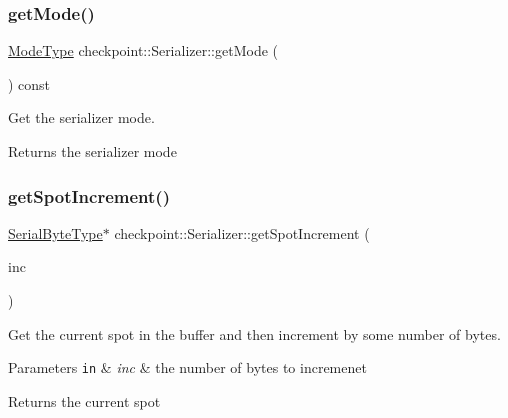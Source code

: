 \subsubsection{\texorpdfstring{get\+Mode()}{getMode()}}
{\footnotesize\ttfamily \hyperlink{namespacecheckpoint_ae2509499ccd8b1dc48fb535bf8aa3059}{Mode\+Type} checkpoint\+::\+Serializer\+::get\+Mode (\begin{DoxyParamCaption}{ }\end{DoxyParamCaption}) const\hspace{0.3cm}{\ttfamily [inline]}}



Get the serializer mode. 

\begin{DoxyReturn}{Returns}
the serializer mode 
\end{DoxyReturn}
\mbox{\label{structcheckpoint_1_1_serializer_af2fc82901c31232b7549b20a8732de30}} 
\subsubsection{\texorpdfstring{get\+Spot\+Increment()}{getSpotIncrement()}}
{\footnotesize\ttfamily \hyperlink{namespacecheckpoint_ae57f01cdc0b81776c23b6c7c934c58f5}{Serial\+Byte\+Type}$\ast$ checkpoint\+::\+Serializer\+::get\+Spot\+Increment (\begin{DoxyParamCaption}\item[{\hyperlink{namespacecheckpoint_a083f6674da3f94c2901b18c6d238217c}{Serial\+Size\+Type} const}]{inc }\end{DoxyParamCaption})\hspace{0.3cm}{\ttfamily [inline]}}



Get the current spot in the buffer and then increment by some number of bytes. 


\begin{DoxyParams}[1]{Parameters}
\mbox{\tt in}  & {\em inc} & the number of bytes to incremenet\\
\hline
\end{DoxyParams}
\begin{DoxyReturn}{Returns}
the current spot 
\end{DoxyReturn}
\mbox{\label{structcheckpoint_1_1_serializer_a01f395bfaa39a8311925c71537877378}} 
